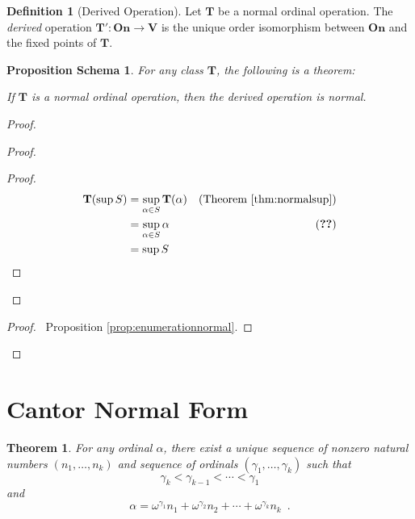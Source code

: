 \documentclass{book}
\let\qed\relax
\newtheorem{props}[ax]{Proposition Schema}
\newtheorem{thm}[ax]{Theorem}
\theoremstyle{definition}
\newtheorem{df}[ax]{Definition}
\begin{document}
\begin{df}[Derived Operation]
Let $\mathbf{T}$ be a normal ordinal operation. The \emph{derived} operation $\mathbf{T}' : \mathbf{On} \rightarrow \mathbf{V}$ is the unique order isomorphism between $\mathbf{On}$ and the fixed points of $\mathbf{T}$.
\end{df}

\begin{props}
For any class $\mathbf{T}$, the following is a theorem:

If $\mathbf{T}$ is a normal ordinal operation, then the derived operation is normal.
\end{props}

\begin{proof}
\pf
{}
\begin{proof}
	\begin{proof}
		\pf
		\begin{align*}
			\mathbf{T}(\sup S) & = \sup_{\alpha \in S} \mathbf{T}(\alpha) & (\text{Theorem \ref{thm:normalsup}}) \\
			& = \sup_{\alpha \in S} \alpha & (\text{\stepref{a}}) \\
			& = \sup S
		\end{align*}
	\end{proof}
\end{proof}
\qedstep
\begin{proof}
	\pf\ Proposition \ref{prop:enumerationnormal}.
\end{proof}
\qed
\end{proof}

\section{Cantor Normal Form}

\begin{thm}
For any ordinal $\alpha$, there exist a unique sequence of nonzero natural numbers $(n_1, \ldots, n_k)$ and sequence of ordinals $(\gamma_1, \ldots, \gamma_k)$ such that
\[ \gamma_k < \gamma_{k-1} < \cdots < \gamma_1 \]
and
\[ \alpha = \omega^{\gamma_1} n_1 + \omega^{\gamma_2} n_2 + \cdots + \omega^{\gamma_k} n_k \enspace . \]
\end{thm}
\end{document}
